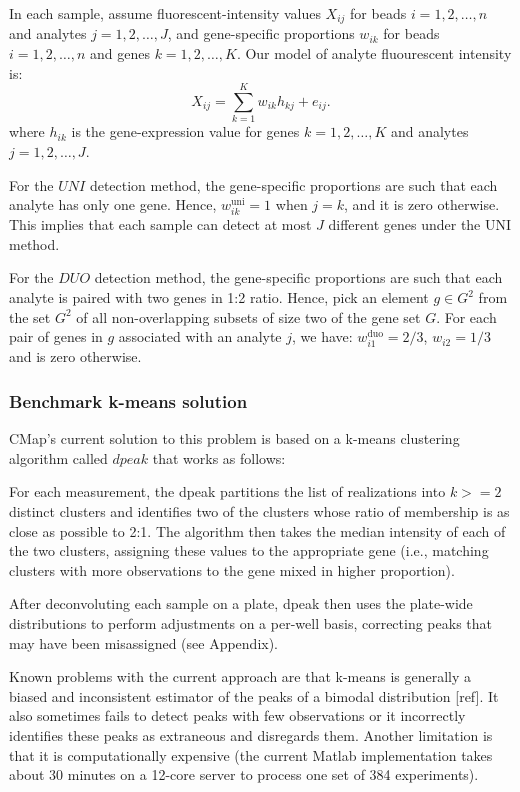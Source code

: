 \documentclass[]{article}
\begin{document}
In each sample, assume fluorescent-intensity values \(X_{ij}\) for beads
\(i=1,2,\dots, n\) and analytes \(j=1,2,\dots, J\), and gene-specific
proportions \(w_{ik}\) for beads \(i=1,2,\dots, n\) and genes
\(k=1,2,\dots, K\). Our model of analyte fluourescent intensity is: \[
  X_{ij} = \sum_{k=1}^{K} w_{ik} h_{kj} + e_{ij}. 
\] where \(h_{ik}\) is the gene-expression value for genes
\(k=1,2,\dots, K\) and analytes \(j=1,2,\dots, J\).

For the \(UNI\) detection method, the gene-specific proportions are such
that each analyte has only one gene. Hence, \(w^{\text{uni}}_{ik} = 1\)
when \(j = k\), and it is zero otherwise. This implies that each sample
can detect at most \(J\) different genes under the UNI method.

For the \(DUO\) detection method, the gene-specific proportions are such
that each analyte is paired with two genes in 1:2 ratio. Hence, pick an
element \(g\in G^2\) from the set \(G^2\) of all non-overlapping subsets
of size two of the gene set \(G\). For each pair of genes in \(g\)
associated with an analyte \(j\), we have:
\(w^{\text{duo}}_{i1} = 2/3\), \(w_{i2}=1/3\) and is zero otherwise.

\hypertarget{benchmark-k-means-solution}{%
\subsubsection{Benchmark k-means
solution}\label{benchmark-k-means-solution}}

CMap's current solution to this problem is based on a k-means clustering
algorithm called \(dpeak\) that works as follows:

For each measurement, the dpeak partitions the list of realizations into
\(k>=2\) distinct clusters and identifies two of the clusters whose
ratio of membership is as close as possible to 2:1. The algorithm then
takes the median intensity of each of the two clusters, assigning these
values to the appropriate gene (i.e., matching clusters with more
observations to the gene mixed in higher proportion).

After deconvoluting each sample on a plate, dpeak then uses the
plate-wide distributions to perform adjustments on a per-well basis,
correcting peaks that may have been misassigned (see Appendix).

Known problems with the current approach are that k-means is generally a
biased and inconsistent estimator of the peaks of a bimodal distribution
{[}ref{]}. It also sometimes fails to detect peaks with few observations
or it incorrectly identifies these peaks as extraneous and disregards
them. Another limitation is that it is computationally expensive (the
current Matlab implementation takes about 30 minutes on a 12-core server
to process one set of 384 experiments).
\end{document}
